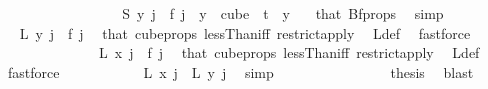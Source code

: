 \begin{isabellebody}
\ \ \ \ \ \ \isamarkupfalse%
{\isacharminus}{\kern0pt}\isanewline
\ \ \ \ \ \ \ \ \isamarkupfalse%
\ {\isacharasterisk}{\kern0pt}{\isacharcolon}{\kern0pt}\ {\isachardoublequoteopen}S\ y\ j\ {\isacharequal}{\kern0pt}\ f\ j{\isachardoublequoteclose}\ \ {\isachardoublequoteopen}y\ {\isasymin}\ cube\ {}\ t{\isachardoublequoteclose}\ \ y\ \isamarkupfalse%
\ {}\ that\ Bf{\isacharunderscore}{\kern0pt}props\ \isamarkupfalse%
\ simp\isanewline
\ \ \ \ \ \ \ \ \isamarkupfalse%
\ \isamarkupfalse%
\ {\isachardoublequoteopen}L\ y\ j\ {\isacharequal}{\kern0pt}\ f\ j{\isachardoublequoteclose}\ \isamarkupfalse%
\ that{\isacharparenleft}{\kern0pt}{}{\isacharparenright}{\kern0pt}\ cube{\isacharunderscore}{\kern0pt}props{\isacharparenleft}{\kern0pt}{}{\isacharcomma}{\kern0pt}{}{\isacharparenright}{\kern0pt}\ lessThan{\isacharunderscore}{\kern0pt}iff\ restrict{\isacharunderscore}{\kern0pt}apply\ \isamarkupfalse%
\ L{\isacharunderscore}{\kern0pt}def\ \isamarkupfalse%
\ fastforce\isanewline
\ \ \ \ \ \ \ \ \isamarkupfalse%
\ \isamarkupfalse%
\ {\isacharasterisk}{\kern0pt}\ \isamarkupfalse%
\ {\isachardoublequoteopen}L\ x\ j\ {\isacharequal}{\kern0pt}\ f\ j{\isachardoublequoteclose}\ \isamarkupfalse%
\ that{\isacharparenleft}{\kern0pt}{}{\isacharparenright}{\kern0pt}\ cube{\isacharunderscore}{\kern0pt}props{\isacharparenleft}{\kern0pt}{}{\isacharcomma}{\kern0pt}{}{\isacharparenright}{\kern0pt}\ lessThan{\isacharunderscore}{\kern0pt}iff\ restrict{\isacharunderscore}{\kern0pt}apply\ \isamarkupfalse%
\ L{\isacharunderscore}{\kern0pt}def\ \isamarkupfalse%
\ fastforce\isanewline
\ \ \ \ \ \ \ \ \isamarkupfalse%
\ \isamarkupfalse%
\ {\isachardoublequoteopen}L\ x\ j\ {\isacharequal}{\kern0pt}\ L\ y\ j{\isachardoublequoteclose}\ \isamarkupfalse%
\ simp\isanewline
\ \ \ \ \ \ \isamarkupfalse%
\isanewline
\ \ \ \ \ \ \isamarkupfalse%
\ \isamarkupfalse%
\ {\isacharquery}{\kern0pt}thesis\ \isamarkupfalse%
\ blast\isanewline
\ \ \ \ \isamarkupfalse%
\isanewline
\ \ \isamarkupfalse%
\isanewline
\ \ \isamarkupfalse%
\ \isamarkupfalse%

\end{isabellebody}
